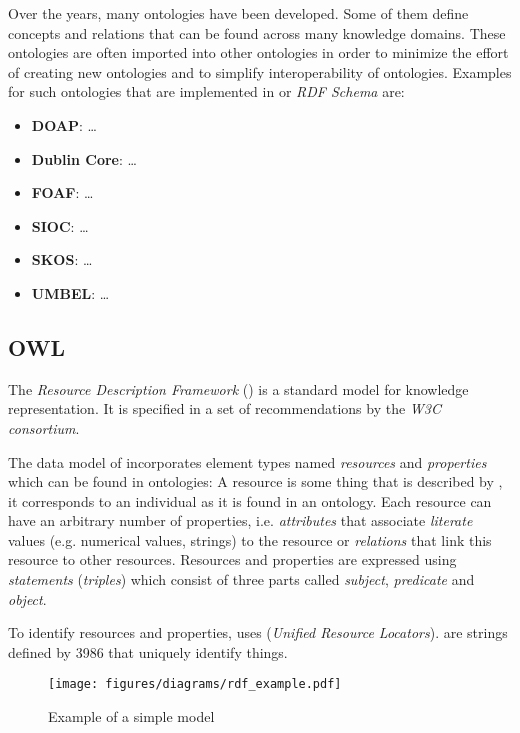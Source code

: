 Over the years, many ontologies have been developed. Some of them define concepts and relations that can be found across many knowledge domains. These ontologies are often imported into other ontologies in order to minimize the effort of creating new ontologies and to simplify interoperability of ontologies. Examples for such ontologies that are implemented in  or \emph{RDF Schema} are:
\begin{itemize} %
  \item \textbf{DOAP}: … %
  \item \textbf{Dublin Core}: … %
  \item \textbf{FOAF}: … %
  \item \textbf{SIOC}: … %
  \item \textbf{SKOS}: … %
  \item \textbf{UMBEL}: … %
\end{itemize}

\subsection{OWL}
\label{subsec:owl}


The \emph{Resource Description Framework} () is a standard model for knowledge representation. It is specified in a set of recommendations by the \emph{W3C consortium}.

The data model of  incorporates element types named \emph{resources} and \emph{properties} which can be found in ontologies: A resource is some thing that is described by , it corresponds to an individual as it is found in an ontology. Each resource can have an arbitrary number of properties, i.e. \emph{attributes} that associate \emph{literate} values (e.g. numerical values, strings) to the resource or \emph{relations} that link this resource to other resources. Resources and properties are expressed using \emph{statements} (\emph{triples}) which consist of three parts called \emph{subject}, \emph{predicate} and \emph{object}. 

To identify resources and properties,  uses  (\emph{Unified Resource Locators}).  are strings defined by  3986 that uniquely identify things.


\begin{figure}
\centering
\texttt{[image: figures/diagrams/rdf\_example.pdf]}
\caption{Example of a simple  model}
\label{fig:rdf_example}
\end{figure}

